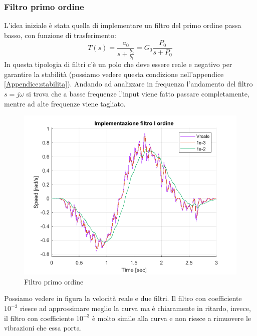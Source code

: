 \subsubsection*{Filtro primo ordine}
L'idea iniziale è stata quella di implementare un filtro del primo ordine passa basso, con funzione di trasferimento:
\begin{equation}
T(s) = \frac{a_0}{s+\frac{b_0}{b_1}} = G_0 \frac{P_0}{s+P_0}
\end{equation}
In questa tipologia di filtri c'è un polo che deve essere reale e negativo per garantire la stabilità (possiamo vedere questa condizione nell'appendice \ref{Appendice:stabilita}). Andando ad analizzare in frequenza l'andamento del filtro $s=j\omega$ si trova che a basse frequenze l'input viene fatto passare completamente, mentre ad alte frequenze viene tagliato.
\begin{figure}[ht]
	\begin{center}
		\includegraphics[scale=0.5]{Immagini/Traiettorie/FiltroIOrdine}
		\caption{Filtro primo ordine}
		\label{fig:filtroIOrd}
	\end{center}
\end{figure}
Possiamo vedere in figura la velocità reale e due filtri. Il filtro con coefficiente $10^{-2}$ riesce ad approssimare meglio la curva ma è chiaramente in ritardo, invece, il filtro con coefficiente $10^{-3}$ è molto simile alla curva e non riesce a rimuovere le vibrazioni che essa porta.
